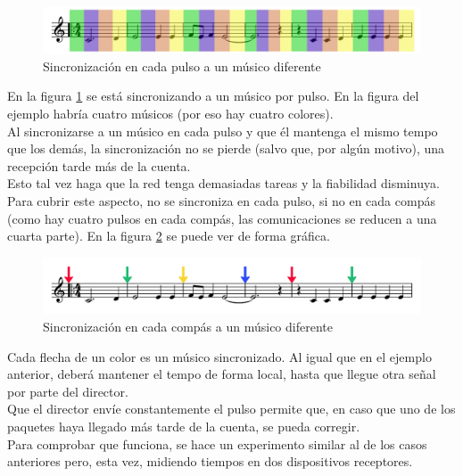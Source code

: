 \begin{figure}[!htb]
\centering
\includegraphics[width=1\textwidth]{./imagenes/sincronotas}
\caption{Sincronización en cada pulso a un músico diferente} \label{fig:sincronotas}
\end{figure}

En la figura \ref{fig:sincronotas} se está sincronizando a un músico por pulso. En
la figura del ejemplo habría cuatro músicos (por eso hay cuatro colores).\\

Al sincronizarse a un músico en cada pulso y que él mantenga el mismo tempo que los demás,
la sincronización no se pierde (salvo que, por algún motivo), una recepción tarde más de
la cuenta.\\

Esto tal vez haga que la red tenga demasiadas tareas y la fiabilidad disminuya. Para
cubrir este aspecto, no se sincroniza en cada pulso, si no en cada compás (como hay
cuatro pulsos en cada compás, las comunicaciones se reducen a una cuarta parte).
En la figura \ref{fig:sincrocompas} se puede ver de forma gráfica.\\

\begin{figure}[!htb]
\centering
\includegraphics[width=1\textwidth]{./imagenes/sincrocompas}
\caption{Sincronización en cada compás a un músico diferente} \label{fig:sincrocompas}
\end{figure}

Cada flecha de un color es un músico sincronizado. Al igual que en el ejemplo anterior,
deberá mantener el tempo de forma local, hasta que llegue otra señal por parte del director.\\

Que el director envíe constantemente el pulso permite que, en caso que uno de los
paquetes haya llegado más tarde de la cuenta, se pueda corregir.\\

Para comprobar que funciona, se hace un experimento similar al de los casos anteriores pero,
esta vez, midiendo tiempos en dos dispositivos receptores.

